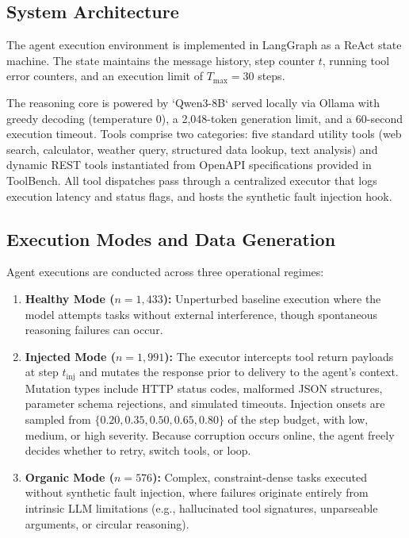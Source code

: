 \documentclass[journal,compsoc]{IEEEtran}
\begin{document}
\subsection{System Architecture}
The agent execution environment is implemented in LangGraph as a ReAct state machine. The state maintains the message history, step counter $t$, running tool error counters, and an execution limit of $T_{\max} = 30$ steps.

The reasoning core is powered by `Qwen3-8B` \cite{yang2025qwen3} served locally via Ollama with greedy decoding (temperature 0), a 2,048-token generation limit, and a 60-second execution timeout. Tools comprise two categories: five standard utility tools (web search, calculator, weather query, structured data lookup, text analysis) and dynamic REST tools instantiated from OpenAPI specifications provided in ToolBench. All tool dispatches pass through a centralized executor that logs execution latency and status flags, and hosts the synthetic fault injection hook.

\subsection{Execution Modes and Data Generation}
Agent executions are conducted across three operational regimes:
\begin{enumerate}
    \item \textbf{Healthy Mode ($n=1,433$):} Unperturbed baseline execution where the model attempts tasks without external interference, though spontaneous reasoning failures can occur.
    \item \textbf{Injected Mode ($n=1,991$):} The executor intercepts tool return payloads at step $t_{\text{inj}}$ and mutates the response prior to delivery to the agent's context. Mutation types include HTTP status codes, malformed JSON structures, parameter schema rejections, and simulated timeouts. Injection onsets are sampled from $\{0.20, 0.35, 0.50, 0.65, 0.80\}$ of the step budget, with low, medium, or high severity. Because corruption occurs online, the agent freely decides whether to retry, switch tools, or loop.
    \item \textbf{Organic Mode ($n=576$):} Complex, constraint-dense tasks executed without synthetic fault injection, where failures originate entirely from intrinsic LLM limitations (e.g., hallucinated tool signatures, unparseable arguments, or circular reasoning).
\end{enumerate}
\end{document}
